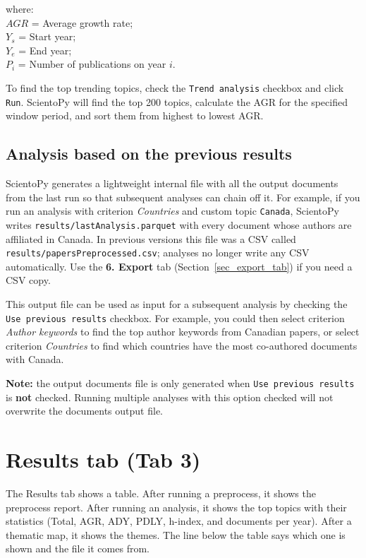 \documentclass[10pt,letterpaper]{article}
\begin{document}
\setlength{\leftskip}{5cm}
\hspace*{-1cm}where:\\
$AGR$ = Average growth rate;\\
$Y_s$ = Start year;\\
$Y_e$ = End year;\\
$P_i$ = Number of publications on year $i.$\\

\setlength{\leftskip}{0pt}

To find the top trending topics, check the \verb|Trend analysis| checkbox and click \verb|Run|. ScientoPy will find the top 200 topics, calculate the AGR for the specified window period, and sort them from highest to lowest AGR.

\subsection{Analysis based on the previous results}

ScientoPy generates a lightweight internal file with all the output documents from the last run so that subsequent analyses can chain off it. For example, if you run an analysis with criterion \emph{Countries} and custom topic \verb|Canada|, ScientoPy writes \verb|results/lastAnalysis.parquet| with every document whose authors are affiliated in Canada. In previous versions this file was a CSV called \verb|results/papersPreprocessed.csv|; analyses no longer write any CSV automatically. Use the \textbf{6. Export} tab (Section~\ref{sec_export_tab}) if you need a CSV copy.

This output file can be used as input for a subsequent analysis by checking the \verb|Use previous results| checkbox. For example, you could then select criterion \emph{Author keywords} to find the top author keywords from Canadian papers, or select criterion \emph{Countries} to find which countries have the most co-authored documents with Canada.

\textbf{Note:} the output documents file is only generated when \verb|Use previous results| is \textbf{not} checked. Running multiple analyses with this option checked will not overwrite the documents output file.


\section{Results tab (Tab 3)}
\label{sec_results_tab}

The Results tab shows a table. After running a preprocess, it shows the preprocess report. After running an analysis, it shows the top topics with their statistics (Total, AGR, ADY, PDLY, h-index, and documents per year). After a thematic map, it shows the themes. The line below the table says which one is shown and the file it comes from.
\end{document}
